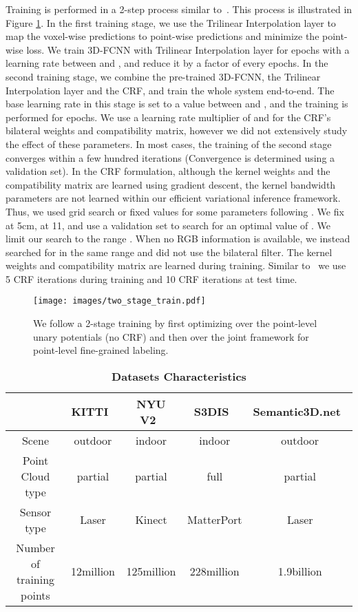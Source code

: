 \documentclass[10pt,twocolumn,letterpaper]{article}
\newcommand{\threedfcnn}[0]{3D-FCNN\xspace}
\newcommand{\crf}[0]{CRF\xspace}
\begin{document}
Training is performed in a 2-step process similar to~\cite{Zheng2015}. This process is illustrated in Figure \ref{fig:training_stages}. In the first training stage, we use the Trilinear Interpolation layer to map the voxel-wise predictions to point-wise predictions and minimize the point-wise loss. We train \threedfcnn with Trilinear Interpolation layer for  epochs with a learning rate between  and , and reduce it by a factor of  every  epochs. In the second training stage, we combine the pre-trained \threedfcnn, the Trilinear Interpolation layer and the \crf, and train the whole system end-to-end. The base learning rate in this stage is set to a value between  and , and the training is performed for  epochs. We use a learning rate multiplier of  and  for the \crf’s bilateral weights and compatibility matrix, however we did not extensively study the effect of these parameters. In most cases, the training of the second stage converges within a few hundred iterations (Convergence is determined using a validation set). In the CRF formulation, although the kernel weights  and the compatibility matrix  are learned using gradient descent, the kernel bandwidth parameters  are not learned within our efficient variational inference framework. Thus, we used grid search or fixed values for some parameters following \cite{denseCRF}. We fix  at 5cm,  at 11, and use a validation set to search for an optimal value of  . We limit our search to the range . When no RGB information is available, we instead searched for   in the same range and did not use the bilateral filter. The kernel weights and compatibility matrix are learned during training. Similar to~\cite{Zheng2015} we use 5 CRF iterations during training and 10 CRF iterations at test time. 
\begin{figure}[t]
\centering
\texttt{[image: images/two\_stage\_train.pdf]}
\caption{\small{We follow a 2-stage training by first optimizing over the point-level unary potentials (no CRF) and then over the joint framework for point-level fine-grained labeling.}}
\label{fig:training_stages}
\vspace{-2mm}
\end{figure}


\begin{table*}[ht]
    \centering
	\caption{\textbf{Datasets Characteristics}}
	\vspace{5mm}
	\begin{tabular}{|c|c|c|c|c|}
	   & \small{KITTI~\cite{Geiger2013IJRR,Geiger:2012:WRA:2354409.2354978}} & \small{NYU V2~\cite{Silberman:ECCV12}} &  \small{S3DIS~\cite{Armeni2016}} & \small{Semantic3D.net~\cite{l3d}}\\
	 \hline
	Scene  & outdoor & indoor & indoor & outdoor\\
	Point Cloud type & partial & partial & full & partial\\
	Sensor type & Laser & Kinect & MatterPort & Laser\\

	Number of training points & 12million & 125million & 228million & 1.9billion\\	
    \end{tabular}
    \label{tab:datasets}
    \vspace{3mm}
\end{table*}
\end{document}
